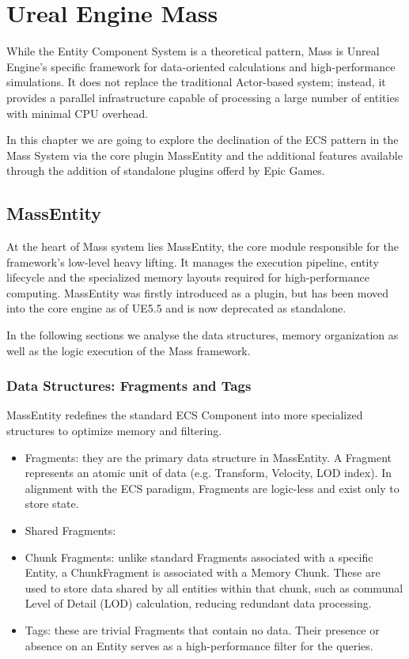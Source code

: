 \chapter{Ureal Engine Mass}
\label{sec:introduction}

While the Entity Component System is a theoretical pattern, Mass is Unreal Engine’s specific framework for data-oriented calculations and high-performance simulations. It does not replace the traditional Actor-based system; instead, it provides a parallel infrastructure capable of processing a large number of entities with minimal CPU overhead.

In this chapter we are going to explore the declination of the ECS pattern in the Mass System via the core plugin MassEntity and the additional features available through the addition of standalone plugins offerd by Epic Games. 

\section[MassEntity]{MassEntity} %

At the heart of Mass system lies MassEntity, the core module responsible for the framework’s low-level heavy lifting. It manages the execution pipeline, entity lifecycle and the specialized memory layouts required for high-performance computing. MassEntity was firstly introduced as a plugin, but has been moved into the core engine as of UE5.5 and is now deprecated as standalone. 

In the following sections we analyse the data structures, memory organization as well as the logic execution of the Mass framework.

\subsection{Data Structures: Fragments and Tags}

MassEntity redefines the standard ECS Component into more specialized structures to optimize memory and filtering.

\begin{itemize}
    \item Fragments: they are the primary data structure in MassEntity. A Fragment represents an atomic unit of data (e.g. Transform, Velocity, LOD index). In alignment with the ECS paradigm, Fragments are logic-less and exist only to store state.
    \item Shared Fragments: 
    \item Chunk Fragments: unlike standard Fragments associated with a specific Entity, a ChunkFragment is associated with a Memory Chunk. These are used to store data shared by all entities within that chunk, such as communal Level of Detail (LOD) calculation, reducing redundant data processing.
    \item Tags: these are trivial Fragments that contain no data. Their presence or absence on an Entity serves as a high-performance filter for the queries.
\end{itemize}

